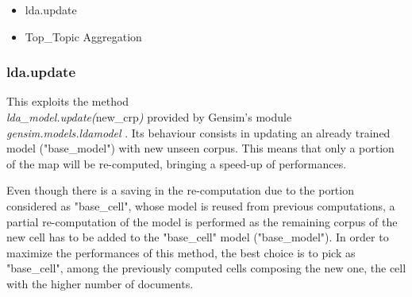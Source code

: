 \begin{itemize}
	\item lda.update
	\item Top\_Topic Aggregation\\
\end{itemize}

\subsubsection{lda.update}
	This exploits the method \\\emph{lda\_model.update(}new\_crp\emph{)} provided by Gensim's module \\\emph{gensim.models.ldamodel} \cite{gensim}. Its behaviour consists in updating an already trained model ("base\_model") with new unseen corpus. This means that only a portion of the map will be re-computed, bringing a speed-up of performances. 


\begin{algorithm}
  
    
    \end{algorithm}
    
    Even though there is a saving in the re-computation due to the portion considered as "base\_cell", whose model is reused from previous computations, a partial re-computation of the model is performed as the remaining corpus of the new cell has to be added to the "base\_cell" model ("base\_model"). In order to maximize the performances of this method, the best choice is to pick as "base\_cell", among the previously computed cells composing the new one, the cell with the higher number of documents.\\

